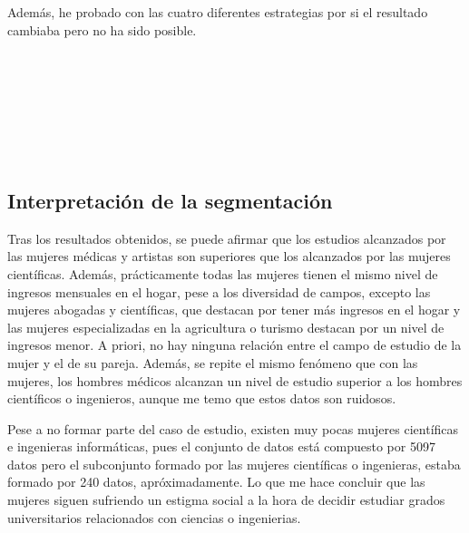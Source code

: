 \documentclass[paper=a4, fontsize=12pt]{article} %
\numberwithin{equation}{section} %
\numberwithin{figure}{section} %
\numberwithin{table}{section} %
\begin{document}
Además, he probado con las cuatro diferentes estrategias por si el resultado cambiaba pero no ha sido posible.

\begin{figure}[H]
    \centering
    \mbox {
    }
\end{figure}

\begin{figure}[H]
    \centering
    \mbox {
    }
\end{figure}

\begin{figure}[H]
    \centering
    \mbox {
    }
\end{figure}

\begin{figure}[H]
    \centering
    \mbox {
    }
\end{figure}
\subsection{Interpretación de la segmentación}

Tras los resultados obtenidos, se puede afirmar que los estudios alcanzados por las mujeres médicas y artistas son superiores que los alcanzados por las mujeres científicas. Además, prácticamente todas las mujeres tienen el mismo nivel de ingresos mensuales en el hogar, pese a los diversidad de campos, excepto las mujeres abogadas y científicas, que destacan por tener más ingresos en el hogar y las mujeres especializadas en la agricultura o turismo destacan por un nivel de ingresos menor. A priori, no hay ninguna relación entre el campo de estudio de la mujer y el de su pareja. Además, se repite el mismo fenómeno que con las mujeres, los hombres médicos alcanzan un nivel de estudio superior a los hombres científicos o ingenieros, aunque me temo que estos datos son ruidosos.

Pese a no formar parte del caso de estudio, existen muy pocas mujeres científicas e ingenieras informáticas, pues el conjunto de datos está compuesto por 5097 datos pero el subconjunto formado por las mujeres científicas o ingenieras, estaba formado por 240 datos, apróximadamente. Lo que me hace concluir que las mujeres siguen sufriendo un estigma social a la hora de decidir estudiar grados universitarios relacionados con ciencias o ingenierias.
\end{document}
